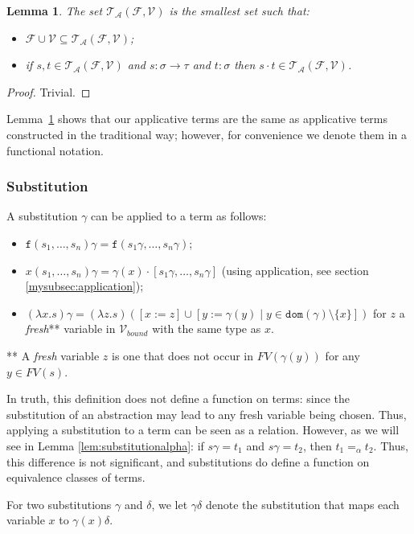 \documentclass{lmcs}
\theoremstyle{theorem}\newtheorem{theorem}{Theorem}
\theoremstyle{theorem}\newtheorem{lemma}[theorem]{Lemma}
\theoremstyle{theorem}\newtheorem{corollary}[theorem]{Corollary}
\theoremstyle{definition}\newtheorem{definition}[theorem]{Definition}
\theoremstyle{definition}\newtheorem{example}[theorem]{Example}
\newcommand{\F}{\mathcal{F}}
\newcommand{\V}{\mathcal{V}}
\newcommand{\Vbound}{\mathcal{V}_{\mathit{bound}}}
\newcommand{\ATerms}{\mathcal{T}_{\mathcal{A}}}
\newcommand{\FV}{\mathit{FV}}
\newcommand{\domain}{\mathtt{dom}}
\newcommand{\atype}{\sigma}
\newcommand{\btype}{\tau}
\newcommand{\identifier}[1]{\mathtt{#1}}
\newcommand{\afun}{\identifier{f}}
\newcommand{\avar}{x}
\newcommand{\bvar}{y}
\newcommand{\cvar}{z}
\newcommand{\abs}[2]{\lambda #1.#2}
\newcommand{\arrtype}{\rightarrow}
\newcommand{\mysubsection}[1]{\vspace{-12pt}\subsubsection{#1}}
\begin{document}
\begin{lemma}\label{lem:applicative_notation}
The set $\ATerms(\F,\V)$ is the smallest set such that:
\begin{itemize}
\item $\F \cup \V \subseteq \ATerms(\F,\V)$;
\item if $s,t \in \ATerms(\F,\V)$ and $s : \atype \arrtype \btype$ and $t : \atype$ then
  $s \cdot t \in \ATerms(\F,\V)$.
\end{itemize}
\end{lemma}

\begin{proof}
Trivial.
\end{proof}

Lemma~\ref{lem:applicative_notation} shows that our applicative terms are the same as applicative
terms constructed in the traditional way; however, for convenience we denote them in a functional
notation.

\mysubsection{Substitution}\label{mysubsec:substitution}
A substitution $\gamma$ can be applied to a term as follows:
\begin{itemize}
\item $\afun(s_1,\dots,s_n)\gamma = \afun(s_1\gamma,\dots,s_n\gamma)$;
\item $\avar(s_1,\dots,s_n)\gamma = \gamma(\avar) \cdot [s_1\gamma,\dots,s_n\gamma]$
  (using application, see section \ref{mysubsec:application});
\item $(\abs{\avar}{s})\gamma = (\abs{\cvar}{s}) ([\avar:=\cvar] \cup [\bvar := \gamma(\bvar) \mid
  \bvar \in \domain(\gamma) \setminus \{\avar\}])$ for $\cvar$ a \emph{fresh}** variable in
  $\Vbound$ with the same type as $\avar$.
\end{itemize}
** A \emph{fresh} variable $\cvar$ is one that does not occur in $\FV(\gamma(\bvar))$ for any
$\bvar \in \FV(s)$.

In truth, this definition does not define a function on terms: since the substitution of an
abstraction may lead to any fresh variable being chosen.  Thus, applying a substitution to a term
can be seen as a relation.  However, as we will see in Lemma \ref{lem:substitutionalpha}: if
$s\gamma = t_1$ and $s\gamma = t_2$, then $t_1 =_\alpha t_2$.  Thus, this difference is not
significant, and substitutions do define a function on equivalence classes of terms.

For two substitutions $\gamma$ and $\delta$, we let $\gamma\delta$ denote the substitution that
maps each variable $x$ to $\gamma(x)\delta$.
\end{document}
